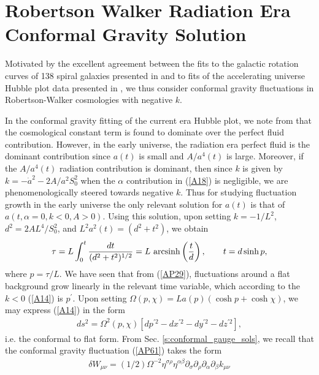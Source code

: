 \section{Robertson Walker Radiation Era Conformal Gravity Solution}
\label{s:rw_radiation_conformal_gravity_sol}

Motivated by the excellent agreement between the fits to the galactic rotation curves of 138 spiral galaxies presented in \cite{mannheim_2011,mannheim_2012, obrien_mannheim_2012} and to fits of the accelerating universe Hubble plot data presented in \cite{mannheim_2006,mannheim_2017}, we thus consider conformal gravity fluctuations in Robertson-Walker cosmologies with negative $k$.

In the conformal gravity fitting of the current era Hubble plot, we note from \cite{mannheim_1990} that the cosmological constant term is found to dominate over the perfect fluid contribution. However, in the early universe, the radiation era perfect fluid is the dominant contribution since $a(t)$ is small and $A/a^4(t)$ is large. Moreover, if the $A/a^4(t)$ radiation contribution is dominant, then since $k$ is given by $k=-\dot{a}^2-2A/a^2S_0^2$ when the $\alpha$ contribution in (\ref{A18}) is negligible, we are phenomenologically steered towards negative $k$. Thus for studying fluctuation growth in the early universe the only relevant solution for $a(t)$ is that of $a(t,\alpha=0,k<0,A>0)$. Using this solution, upon setting $k=-1/L^2$, $d^2=2AL^4/S_0^2$, and $L^2a^2(t)=(d^2+t^2)$, we obtain
%
\begin{eqnarray}
\tau=L\int_0^t \frac{dt}{(d^2+t^2)^{1/2}}=L~{\rm arc sinh}\left(\frac{t}{d}\right),\qquad t=d\sinh p,
\label{B1}
\end{eqnarray}
%
where $p=\tau/L$. We have seen that from (\ref{AP29}), fluctuations around a flat background grow linearly in the relevant time variable, which according to the $k<0$ (\ref{A14}) is $p^{\prime}$. Upon setting $\Omega(p,\chi)=La(p)(\cosh p+\cosh \chi)$, we may express (\ref{A14}) in the form
%
\begin{eqnarray}
ds^2=\Omega^2(p,\chi)\left[dp^{\prime 2}-dx^{\prime 2} -dy^{\prime 2} -dz^{\prime 2}\right],
\label{B2}
\end{eqnarray}
%
i.e. the conformal to flat form. From Sec. \ref{s:conformal_gauge_sols}, we recall that the conformal gravity fluctuation (\ref{AP61}) takes the form
%
\begin{eqnarray}
\delta W_{\mu\nu}=(1/2)\Omega^{-2}\eta^{\sigma\rho}\eta^{\alpha\beta}\partial_{\sigma}\partial_{\rho} \partial_{\alpha}\partial_{\beta}k_{\mu\nu}
\end{eqnarray}
